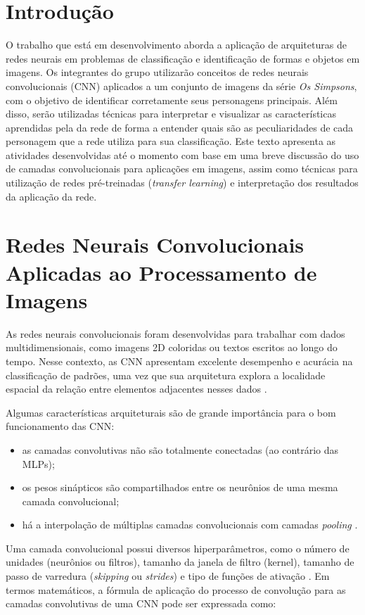 \chapter{Introdução}

O trabalho que está em desenvolvimento aborda a aplicação de arquiteturas de redes neurais em problemas de classificação e identificação de formas e objetos em imagens. Os integrantes do grupo utilizarão conceitos de redes neurais convolucionais (CNN) aplicados
a um conjunto de imagens da série \emph{Os Simpsons}, com o objetivo de identificar corretamente seus personagens principais. Além disso, serão utilizadas técnicas para interpretar e visualizar as características aprendidas pela da rede de forma a entender quais são as peculiaridades de cada personagem que a rede utiliza para sua classificação. Este texto apresenta as atividades desenvolvidas até o momento com base em uma breve discussão do uso de camadas convolucionais para aplicações em imagens, assim como técnicas para utilização de redes pré-treinadas (\textit{transfer learning}) e interpretação dos resultados da aplicação da rede.

\chapter{Redes Neurais Convolucionais Aplicadas ao Processamento de Imagens}

As redes neurais convolucionais foram desenvolvidas para trabalhar com dados multidimensionais, como imagens 2D coloridas ou textos escritos ao longo do tempo. Nesse contexto, as CNN apresentam excelente desempenho e acurácia na classificação de padrões, uma vez que
sua arquitetura explora a localidade espacial da relação entre elementos adjacentes nesses dados \cite{lecun2015deep}.

Algumas características arquiteturais são de grande importância para o bom funcionamento das CNN: 
\begin{itemize}
\item as camadas convolutivas não são totalmente conectadas (ao contrário das MLPs);
\item os pesos sinápticos são compartilhados entre os neurônios de uma mesma camada convolucional;
\item há a interpolação de múltiplas camadas convolucionais com camadas \emph{pooling} \cite{lecun2015deep}. 
\end{itemize}

Uma camada convolucional possui diversos hiperparâmetros, como o número de unidades (neurônios ou filtros), tamanho da janela de filtro (kernel), tamanho de passo de varredura (\textit{skipping} ou \textit{strides}) e tipo de funções de ativação \cite{cirecsan2011high}. Em termos matemáticos, a fórmula de aplicação do processo de convolução para as camadas convolutivas de uma CNN pode ser expressada como:

